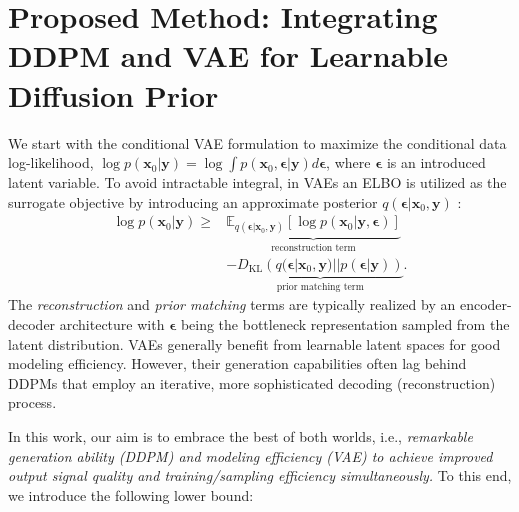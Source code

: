 \section{Proposed Method: Integrating DDPM and VAE for Learnable Diffusion Prior}

We start with the conditional VAE \citep{sohn2015learning} formulation to maximize the conditional data log-likelihood, $\log p(\mathbf{x}_0|\mathbf{y})=\log\int p(\mathbf{x}_0,\boldsymbol{\epsilon}|\mathbf{y}) d\boldsymbol{\epsilon}$, where $\boldsymbol{\epsilon}$ is an introduced latent variable. To avoid intractable integral, in VAEs an ELBO is utilized as the surrogate objective by introducing an approximate posterior $q(\boldsymbol{\epsilon}|\mathbf{x}_0,\mathbf{y})$ \citep{harvey2022conditional}:
\begin{equation}
\begin{aligned}
    \log p(\mathbf{x}_0|\mathbf{y})\geq&\underbrace{\mathbb{E}_{q(\boldsymbol{\epsilon}|\mathbf{x}_0,\mathbf{y})}\left[\log p(\mathbf{x}_0|\mathbf{y},\boldsymbol{\epsilon})\right]}_{\text{reconstruction term}} \\ 
    &- \underbrace{D_{\text{KL}}\left(q(\boldsymbol{\epsilon}|\mathbf{x}_0,\mathbf{y}) || p(\boldsymbol{\epsilon}|\mathbf{y})\right)}_{\text{prior matching term}}.
\label{eq: vae original elbo}
\end{aligned}
\end{equation}
The \textit{reconstruction} and \textit{prior matching} terms are typically realized by an encoder-decoder architecture with $\boldsymbol{\epsilon}$ being the bottleneck representation sampled from the latent distribution. VAEs generally benefit from learnable latent spaces for good modeling efficiency. However, their generation capabilities often lag behind DDPMs that employ an iterative, more sophisticated decoding (reconstruction) process.

In this work, our aim is to embrace the best of both worlds, i.e., \textit{remarkable generation ability (DDPM) and modeling efficiency (VAE) to achieve improved output signal quality and training/sampling efficiency simultaneously.} To this end, we introduce the following lower bound:

\vspace{0.2cm}

